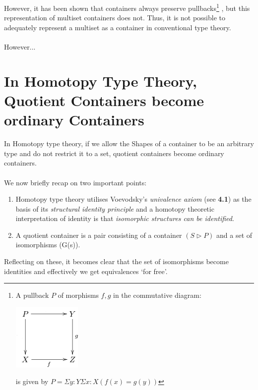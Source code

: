 \documentclass[12pt]{report}
\begin{document}
\pagebreak
 However, it has been shown that containers always preserve pullbacks\cite{ghani1}\footnote{
A pullback $P$ of morphisms $f,g$ in the commutative diagram:
\begin{center}
\includegraphics[scale=0.6]{pullback.png}
\end{center}
is given by $P = \Sigma y:Y\Sigma x:X (f(x)=g(y))$
}
, but this representation of multiset containers does not\cite{lyon}. Thus, it is not possible to adequately represent a multiset as a container in conventional type theory.\\
\\
However...

\chapter{In Homotopy Type Theory, Quotient Containers become ordinary Containers}
In Homotopy type theory, if we allow the Shapes of a container to be an arbitrary type and do not restrict it to a set, quotient containers become ordinary containers. \\
\\
We now briefly recap on two important points:
\begin{enumerate}
\item Homotopy type theory utilises Voevodsky's \textit{univalence axiom} (see \textbf{4.1}) as the basis of its \textit{structural identity principle} and a homotopy theoretic interpretation of identity is that \textit{isomorphic structures can be identified}.

\item A quotient container is a pair consisting of a container $(S \rhd P)$ and a set of isomorphisms (G(s)).
\end{enumerate}
Reflecting on these, it becomes clear that the set of isomorphisms become identities and effectively we get equivalences `for free'. 
\end{document}
